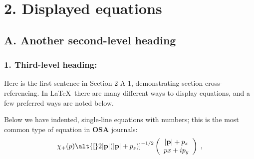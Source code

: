 \section*{2. Displayed equations}
\subsection*{A. Another second-level heading}
\subsubsection*{1. Third-level heading:}
\label{sec:level3}

Here is the first sentence in Section 2 A 1, demonstrating
section cross-referencing.
In \LaTeX\ there are many different ways to display equations, and a
few preferred ways are noted below.

Below we have indented, single-line equations with numbers; this is
the most common type of equation in {\bf OSA} journals:
\begin{equation}
\chi_+(p)\alt{\bf [}2|{\bf p}|(|{\bf p}|+p_z){\bf ]}^{-1/2}
\left(
\begin{array}{c}
|{\bf p}|+p_z\\
px+ip_y
\end{array}\right)\;,
\end{equation}

